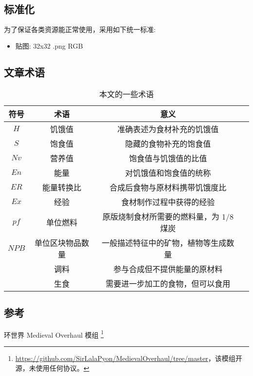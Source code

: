 \subsection{标准化}

为了保证各类资源能正常使用，采用如下统一标准:
\begin{itemize}
    \item 贴图: 32x32 .png RGB
\end{itemize}

\subsection{文章术语}

\begin{center}
    \setlength{\tabcolsep}{4mm}
    \begin{longtable}{c|ccc}
        \caption{本文的一些术语} \\
        \toprule
        \textbf{符号} & \textbf{术语} & \textbf{意义} \\
        \midrule
        $H$ & 饥饿值 & 准确表述为食材补充的饥饿值 \\
        $S$ & 饱食值 & 隐藏的食物补充的饱食值 \\
        $Nv$ & 营养值 & 饱食值与饥饿值的比值 \\
        $En$ & 能量 & 对饥饿值和饱食值的统称 \\
        $ER$ & 能量转换比 & 合成后食物与原材料携带饥饿度比 \\
        $Ex$ & 经验 & 食材制作过程中获得的经验 \\
        $pf$ & 单位燃料 & 原版烧制食材所需要的燃料量，为 1/8 煤炭 \\
        $NPB$ & 单位区块物品数量 & 一般描述特征中的矿物，植物等生成数量 \\
        & 调料 & 参与合成但不提供能量的原材料 \\
        & 生食 & 需要进一步加工的食物，但可以食用 \\
        \bottomrule
    \end{longtable}
\end{center}

\subsection{参考}

环世界 Medieval Overhaul 模组 \footnote{\url{https://github.com/SirLalaPyon/MedievalOverhaul/tree/master}，该模组开源，未使用任何协议。}

\newpage
